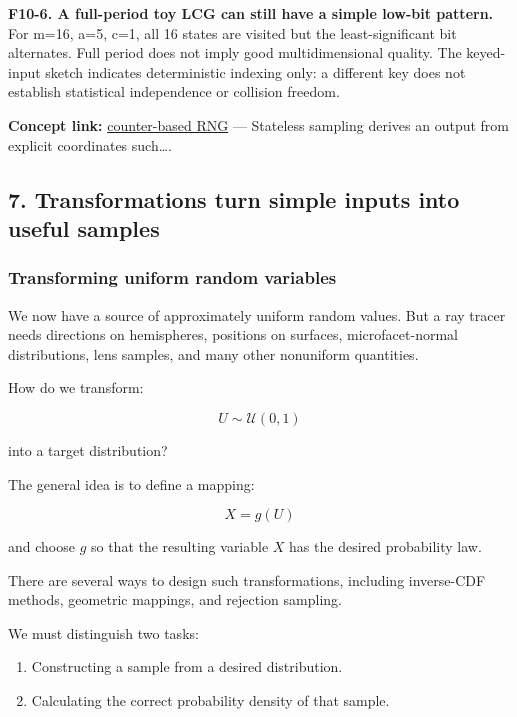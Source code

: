\textbf{F10-6. A full-period toy LCG can still have a simple low-bit pattern.} For m=16, a=5, c=1, all 16 states are visited but the least-significant bit alternates. Full period does not imply good multidimensional quality. The keyed-input sketch indicates deterministic indexing only: a different key does not establish statistical independence or collision freedom.

\textbf{Concept link:} \hyperref[02-foundations-ii-ch029-a-computer-produces-deterministic-pseudorandom-sequences]{counter-based RNG} --- Stateless sampling derives an output from explicit coordinates such\ldots.

\subsection{7. Transformations turn simple inputs into useful samples}\label{02-foundations-ii-ch029-transformations-turn-simple-inputs-into-useful-samples}

\hypertarget{02-foundations-ii-ch029-transformations-turn-simple-inputs-into-useful-samples}{}

\subsubsection{Transforming uniform random variables}\label{02-foundations-ii-ch029-transforming-uniform-random-variables}

\hypertarget{02-foundations-ii-ch029-transforming-uniform-random-variables}{}

We now have a source of approximately uniform random values. But a ray tracer needs directions on hemispheres, positions on surfaces, microfacet-normal distributions, lens samples, and many other nonuniform quantities.

How do we transform:

\[
 U\sim\mathcal U(0,1)
\]

into a target distribution?

The general idea is to define a mapping:

\[
 \boxed{X=g(U)}
\]

and choose \(g\) so that the resulting variable \(X\) has the desired probability law.

There are several ways to design such transformations, including inverse-CDF methods, geometric mappings, and rejection sampling.

We must distinguish two tasks:

\begin{enumerate}
\def\labelenumi{\arabic{enumi}.}
\tightlist
\item
  Constructing a sample from a desired distribution.
\item
  Calculating the correct probability density of that sample.
\end{enumerate}

